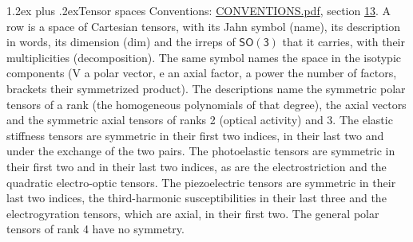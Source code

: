 \documentclass[10pt,a4paper]{article}
\makeatletter
\renewcommand\section{\@startsection{section}{1}{\z@}{-3ex plus -1ex minus -.2ex}%
  {1.2ex plus .2ex}{\normalfont\large\sffamily\bfseries\color{parttitle}}}
\numberwithin{equation}{section}
\newcommand{\grp}[1]{\mathsf{#1}}
\makeatother
\begin{document}
\section{Tensor spaces}\label{s:tensor_spaces}
Conventions: \href{../../CONVENTIONS.pdf}{CONVENTIONS.pdf}, section \href{../../CONVENTIONS.pdf\#conv.13}{13}.
\leavevmode\label{n:head.name}\label{n:head.description}\label{n:head.dim}\label{n:head.decomposition}A row is a space of Cartesian tensors, with its Jahn symbol (name), its description in words, its dimension (dim) and the irreps of $\grp{SO(3)}$ that it carries, with their multiplicities (decomposition). \label{n:label.jahn}The same symbol names the space in the isotypic components (V a polar vector, e an axial factor, a power the number of factors, brackets their symmetrized product). The descriptions name the symmetric polar tensors of a rank (the homogeneous polynomials of that degree), the axial vectors and the symmetric axial tensors of ranks 2 (optical activity) and 3. The elastic stiffness tensors are symmetric in their first two indices, in their last two and under the exchange of the two pairs. The photoelastic tensors are symmetric in their first two and in their last two indices, as are the electrostriction and the quadratic electro-optic tensors. The piezoelectric tensors are symmetric in their last two indices, the third-harmonic susceptibilities in their last three and the electrogyration tensors, which are axial, in their first two. The general polar tensors of rank 4 have no symmetry.
\end{document}
